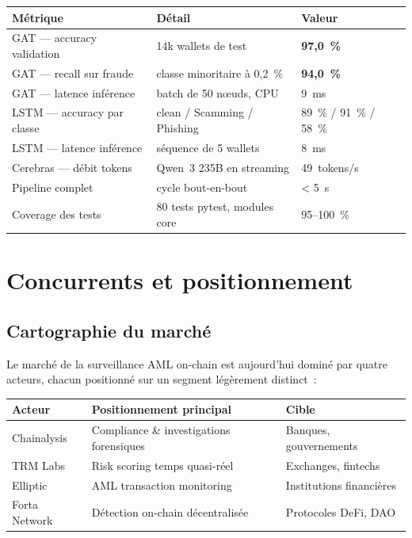 \documentclass[11pt,a4paper]{article}
\begin{document}
\begin{tabularx}{\linewidth}{@{}lXl@{}}
\toprule
\textbf{Métrique} & \textbf{Détail} & \textbf{Valeur} \\
\midrule
GAT --- accuracy validation & 14k wallets de test & \textbf{97,0~\%} \\
GAT --- recall sur fraude & classe minoritaire à 0,2~\% & \textbf{94,0~\%} \\
GAT --- latence inférence & batch de 50 nœuds, CPU & 9~ms \\
LSTM --- accuracy par classe & clean / Scamming / Phishing & 89~\% / 91~\% / 58~\% \\
LSTM --- latence inférence & séquence de 5 wallets & 8~ms \\
Cerebras --- débit tokens & Qwen~3 235B en streaming & 49~tokens/s \\
Pipeline complet & cycle bout-en-bout & < 5~s \\
Coverage des tests & 80 tests pytest, modules core & 95--100~\% \\
\bottomrule
\end{tabularx}

\section{Concurrents et positionnement}

\subsection{Cartographie du marché}

Le marché de la surveillance AML on-chain est aujourd'hui dominé par
quatre acteurs, chacun positionné sur un segment légèrement distinct~:

\begin{tabularx}{\linewidth}{@{}lXl@{}}
\toprule
\textbf{Acteur} & \textbf{Positionnement principal} & \textbf{Cible} \\
\midrule
Chainalysis & Compliance \& investigations forensiques & Banques, gouvernements \\
TRM Labs & Risk scoring temps quasi-réel & Exchanges, fintechs \\
Elliptic & AML transaction monitoring & Institutions financières \\
Forta Network & Détection on-chain décentralisée & Protocoles DeFi, DAO \\
\bottomrule
\end{tabularx}
\end{document}
